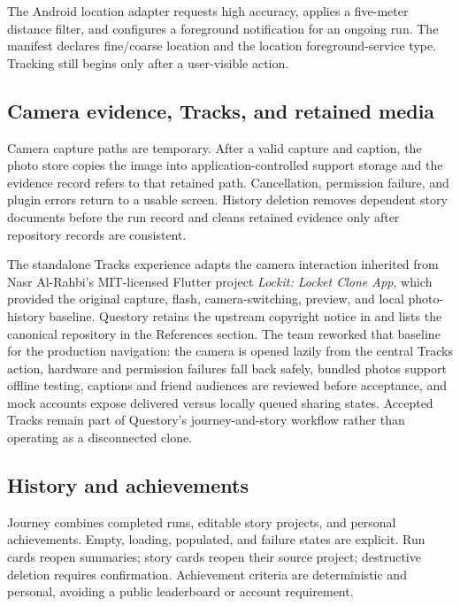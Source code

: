 The Android location adapter requests high accuracy, applies a five-meter
distance filter, and configures a foreground notification for an ongoing run.
The manifest declares fine/coarse location and the location foreground-service
type. Tracking still begins only after a user-visible action.


\subsection{Camera evidence, Tracks, and retained media}
Camera capture paths are temporary. After a valid capture and caption, the photo
store copies the image into application-controlled support storage and the
evidence record refers to that retained path. Cancellation, permission failure,
and plugin errors return to a usable screen. History deletion removes dependent
story documents before the run record and cleans retained evidence only after
repository records are consistent.

The standalone Tracks experience adapts the camera interaction inherited from
Nasr Al-Rahbi's MIT-licensed Flutter project \emph{Lockit: Locket Clone App},
which provided the original capture, flash, camera-switching, preview, and local
photo-history baseline. Questory retains the upstream copyright notice in
 and lists the canonical repository in the References section.
The team reworked that baseline for the production navigation: the camera is
opened lazily from the central Tracks action, hardware and permission failures
fall back safely, bundled photos support offline testing, captions and friend
audiences are reviewed before acceptance, and mock accounts expose delivered
versus locally queued sharing states. Accepted Tracks remain part of Questory's
journey-and-story workflow rather than operating as a disconnected clone.


\subsection{History and achievements}
Journey combines completed runs, editable story projects, and personal
achievements. Empty, loading, populated, and failure states are explicit. Run
cards reopen summaries; story cards reopen their source project; destructive
deletion requires confirmation. Achievement criteria are deterministic and
personal, avoiding a public leaderboard or account requirement.

